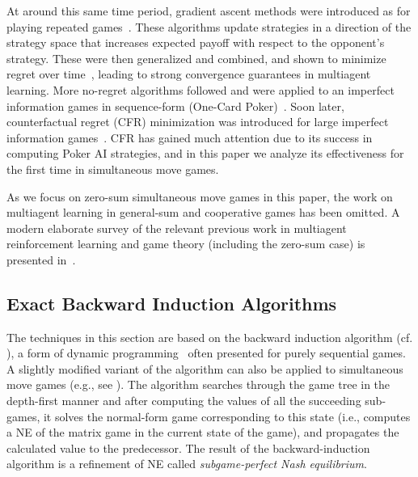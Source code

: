 At around this same time period, gradient ascent methods were introduced as for playing 
repeated games~\cite{Singh20Nash,Bowling01WoLF}. These algorithms update strategies in a direction of the strategy space 
that increases expected payoff with respect to the opponent's strategy. These were then generalized and combined, and 
shown to minimize regret over time~\cite{Zinkevich03Online,Bowling05Convergence}, leading to strong convergence 
guarantees in multiagent learning. More no-regret algorithms followed and were applied to an imperfect information 
games in sequence-form (One-Card Poker)~\cite{Gordon06No}. Soon later, counterfactual regret (CFR) minimization was 
introduced for large imperfect information games~\cite{CFR}. CFR has gained much attention due to its success in 
computing Poker AI strategies, and in this paper we analyze its effectiveness for the first time in simultaneous 
move games. 

As we focus on zero-sum simultaneous move games in this paper, the work on multiagent learning in general-sum and 
cooperative games has been omitted. A modern elaborate survey of the relevant previous work in multiagent 
reinforcement learning and game theory (including the zero-sum case) is presented in~\cite{Nowe12MARLchapter}. 

\subsection{Exact Backward Induction Algorithms}

The techniques in this section are based on the backward induction algorithm (cf. \cite{Shoham09}), 
a form of dynamic programming~\cite{Bellman57} often presented for purely sequential games. 
A slightly modified variant of the algorithm can also be applied to simultaneous move 
games (e.g., see \cite{Ross71Goofspiel,buro2003,Rhoads12Computer}). 
The algorithm searches through the game tree in the depth-first manner and after computing the values of all the succeeding sub-games, it solves the normal-form game corresponding to this state (i.e., computes a NE of the matrix game in the current state of the game), and propagates the calculated value to the predecessor. The result of the backward-induction algorithm is a refinement of NE called \emph{subgame-perfect Nash equilibrium}. 

